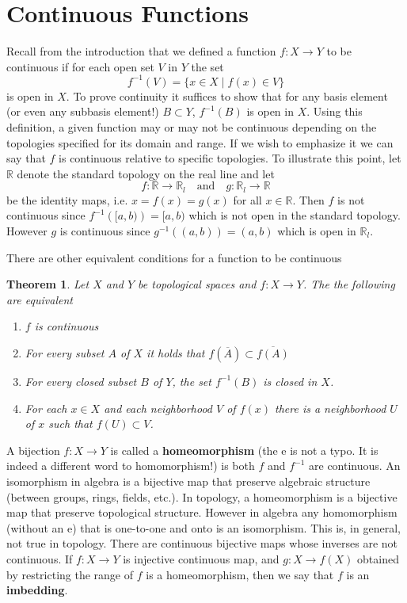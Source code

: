 \documentclass{article}
\newcommand{\R}{\mathbb{R}}
\newtheorem{theorem}{Theorem}[section]
\theoremstyle{remark}
\begin{document}
\section{Continuous Functions}
Recall from the introduction that we defined a function $f:X\to Y$ to be continuous if for each open set $V$ in $Y$ the set
$$f^{-1}(V)=\{x\in X\mid f(x)\in V\} $$
is open in $X$. To prove continuity it suffices to show that for any basis element (or even any subbasis element!) $B\subset Y$, $f^{-1}(B)$ is open in $X$. 
Using this definition, a given function may or may not be continuous depending on the topologies specified for its domain and range. 
If we wish to emphasize it we can say that $f$ is continuous relative to specific topologies.
To illustrate this point, let $\R$ denote the standard topology on the real line and let
$$
    f:\R\to\R_l\quad\text{and}\quad g:\R_l\to\R
$$
be the identity maps, i.e. $x=f(x)=g(x)$ for all $x\in\R$.
Then $f$ is not continuous since $f^{-1}\left([a,b)\right)=[a,b)$ which is not open in the standard topology.
However $g$ is continuous since $g^{-1}\left((a,b)\right)=(a,b)$ which is open in $\R_l$.

There are other equivalent conditions for a function to be continuous
\begin{theorem}
    Let $X$ and $Y$ be topological spaces and $f:X\to Y$. The the following are equivalent
    \begin{enumerate}
        \item $f$ is continuous
        \item For every subset $A$ of $X$ it holds that $f\left(\overline{A}\right)\subset\overline{f(A)}$
        \item For every closed subset $B$ of $Y$, the set $f^{-1}(B)$ is closed in $X$.
        \item For each $x\in X$ and each neighborhood $V$ of $f(x)$ there is a neighborhood $U$ of $x$ such that $f(U)\subset V$.
    \end{enumerate}
\end{theorem}

A bijection $f:X\to Y$ is called a \textbf{homeomorphism} (the e is not a typo. It is indeed a different word to homomorphism!) is both $f$ and $f^{-1}$ are continuous.
An isomorphism in algebra is a bijective map that preserve algebraic structure (between groups, rings, fields, etc.).
In topology, a homeomorphism is a bijective map that preserve topological structure. However in algebra any homomorphism (without an e) that is one-to-one and onto is an isomorphism.
This is, in general, not true in topology. There are continuous bijective maps whose inverses are not continuous. 
If $f:X\to Y$ is injective continuous map, and $g:X\to f(X)$ obtained by restricting the range of $f$ is a homeomorphism, then we say that $f$ is an \textbf{imbedding}.
\end{document}
